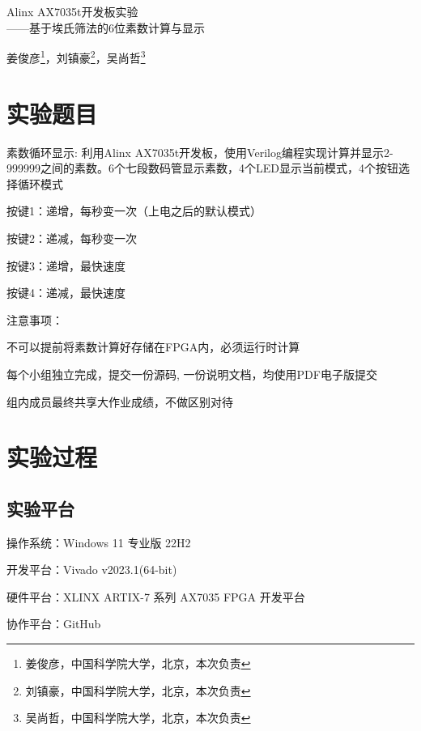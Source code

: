 \def\allfiles{}


	\setlength{\baselineskip}{22pt}
	 \pagestyle{fancy}
	\begin{center}
		\Huge Alinx AX7035t开发板实验\\
		\Large ——基于埃氏筛法的6位素数计算与显示
	\end{center}
	\begin{center}
		\large \kaishu 姜俊彦\footnote{姜俊彦，中国科学院大学，北京，本次负责}，刘镇豪\footnote{刘镇豪，中国科学院大学，北京，本次负责}，吴尚哲\footnote{吴尚哲，中国科学院大学，北京，本次负责}
	\end{center}
	\tableofcontents
	\setcounter{page}{1}
	\thispagestyle{fancy}
	\newpage
	\section{实验题目}
	\large\kaishu  素数循环显示: 利用Alinx AX7035t开发板，使用Verilog编程实现计算并显示2-999999之间的素数。6个七段数码管显示素数，4个LED显示当前模式，4个按钮选择循环模式
	
	\begin{compactitem}
		\item 按键1：递增，每秒变一次（上电之后的默认模式）
		\item 按键2：递减，每秒变一次
		\item 按键3：递增，最快速度
		\item 按键4：递减，最快速度
	\end{compactitem}
	注意事项：
	\begin{compactenum}
		\item 不可以提前将素数计算好存储在FPGA内，必须运行时计算
		\item 每个小组独立完成，提交一份源码, 一份说明文档，均使用PDF电子版提交
		\item 组内成员最终共享大作业成绩，不做区别对待
	\end{compactenum}
	\section{实验过程}
	\songti
	\subsection{实验平台}
	\begin{compactitem}
		\item 操作系统：Windows 11 专业版 22H2
		\item 开发平台：Vivado v2023.1(64-bit)
		\item 硬件平台：XLINX ARTIX-7 系列 AX7035 FPGA 开发平台
		\item 协作平台：GitHub
	\end{compactitem}
